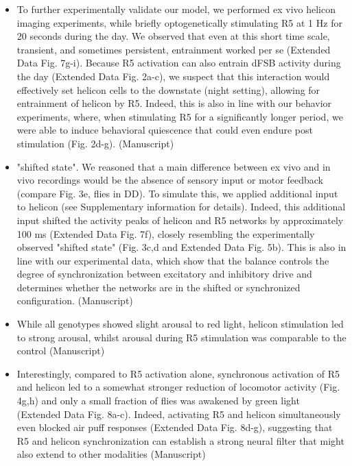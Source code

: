 \documentclass[11pt]{article}
\begin{document}
\begin{itemize}
    \item To further experimentally validate our model, we performed ex vivo helicon imaging
    experiments, while briefly optogenetically stimulating R5 at 1 Hz for 20 seconds during the
    day. We observed that even at this short time scale, transient, and sometimes persistent,
    entrainment worked per se (Extended Data Fig. 7g-i). Because R5 activation can also entrain
    dFSB activity during the day (Extended Data Fig. 2a-c), we suspect that this interaction would
    effectively set helicon cells to the downstate (night setting), allowing for entrainment of
    helicon by R5. Indeed, this is also in line with our behavior experiments, where, when
    stimulating R5 for a significantly longer period, we were able to induce behavioral quiescence
    that could even endure post stimulation (Fig. 2d-g).
    \cite{raccugliaCoherentMultilevelNetwork2022} (Manuscript)

    \item "shifted state". We
    reasoned that a main difference between ex vivo and in vivo recordings would be the absence
    of sensory input or motor feedback (compare Fig. 3e, flies in DD). To simulate this, we applied
    additional input to helicon (see Supplementary information for details). Indeed, this
    additional input shifted the activity peaks of helicon and R5 networks by approximately 100
    ms (Extended Data Fig. 7f), closely resembling the experimentally observed "shifted state" (Fig.
    3c,d and Extended Data Fig. 5b). This is also in line with our experimental data, which show
    that the balance controls the degree of synchronization between excitatory and inhibitory
    drive and determines whether the networks are in the shifted or synchronized configuration.
    \cite{raccugliaCoherentMultilevelNetwork2022} (Manuscript)

    \item While all genotypes
    showed slight arousal to red light, helicon stimulation led to strong arousal, whilst arousal
    during R5 stimulation was comparable to the control
    \cite{raccugliaCoherentMultilevelNetwork2022} (Manuscript)

    \item Interestingly, compared to R5 activation alone, synchronous activation of R5 and helicon led
    to a somewhat stronger reduction of locomotor activity (Fig. 4g,h) and only a small fraction of
    flies was awakened by green light (Extended Data Fig. 8a-c). Indeed, activating R5 and helicon
    simultaneously even blocked air puff responses (Extended Data Fig. 8d-g), suggesting that R5
    and helicon synchronization can establish a strong neural filter that might also extend to other
    modalities
    \cite{raccugliaCoherentMultilevelNetwork2022} (Manuscript)


\end{itemize}
\end{document}
